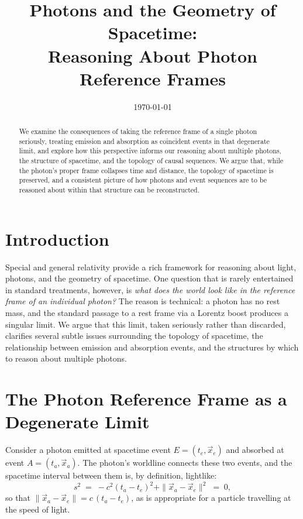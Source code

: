 \documentclass[11pt]{article}
\title{Photons and the Geometry of Spacetime:\\
Reasoning About Photon Reference Frames}
\date{\today}
\begin{document}
\maketitle

\begin{abstract}
We examine the consequences of taking the reference frame of a single photon seriously, treating emission and absorption as coincident events in that degenerate limit, and explore how this perspective informs our reasoning about multiple photons, the structure of spacetime, and the topology of causal sequences. We argue that, while the photon's proper frame collapses time and distance, the topology of spacetime is preserved, and a consistent picture of how photons and event sequences are to be reasoned about within that structure can be reconstructed.
\end{abstract}

\section{Introduction}

Special and general relativity provide a rich framework for reasoning about light, photons, and the geometry of spacetime. One question that is rarely entertained in standard treatments, however, is \emph{what does the world look like in the reference frame of an individual photon?} The reason is technical: a photon has no rest mass, and the standard passage to a rest frame via a Lorentz boost produces a singular limit. We argue that this limit, taken seriously rather than discarded, clarifies several subtle issues surrounding the topology of spacetime, the relationship between emission and absorption events, and the structures by which to reason about multiple photons.

\section{The Photon Reference Frame as a Degenerate Limit}

Consider a photon emitted at spacetime event $E = (t_e, \vec{x}_e)$ and absorbed at event $A = (t_a, \vec{x}_a)$. The photon's worldline connects these two events, and the spacetime interval between them is, by definition, lightlike:
\begin{equation}
s^2 \;=\; -c^2(t_a - t_e)^2 + \|\vec{x}_a - \vec{x}_e\|^2 \;=\; 0,
\label{eq:lightlike}
\end{equation}
so that $\|\vec{x}_a - \vec{x}_e\| = c \, (t_a - t_e)$, as is appropriate for a particle travelling at the speed of light.
\end{document}
